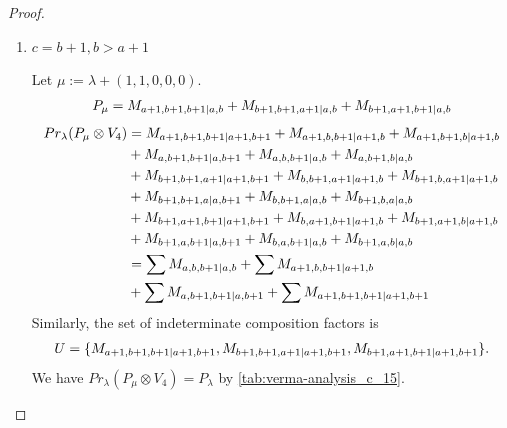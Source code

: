 \begin{proof}
\begin{enumerate}
\begin{enumerate}
        \item $c=b+1,b>a+1$ \par
        Let $\mu:=\lambda + (1,1,0,0,0) $.
        \begin{equation}\notag
          \begin{aligned}
            P_\mu = M_{a+1,b+1,b+1|a,b}
+ M_{b+1,b+1,a+1|a,b}
+ M_{b+1,a+1,b+1|a,b}
          \end{aligned}
        \end{equation}
        \begin{equation}\notag
          \begin{aligned}
            Pr_{\lambda}(P_\mu \otimes V_{4}) &=
M_{a+1,b+1,b+1|a+1,b+1}
+ M_{a+1,b,b+1|a+1,b}
+ M_{a+1,b+1,b|a+1,b}\\
                                              &
+ M_{a,b+1,b+1|a,b+1}
+ M_{a,b,b+1|a,b}
+ M_{a,b+1,b|a,b}\\
                                              &
+ M_{b+1,b+1,a+1|a+1,b+1}
+ M_{b,b+1,a+1|a+1,b}
+ M_{b+1,b,a+1|a+1,b}\\
                                              &
+ M_{b+1,b+1,a|a,b+1}
+ M_{b,b+1,a|a,b}
+ M_{b+1,b,a|a,b}\\
                                              &
+ M_{b+1,a+1,b+1|a+1,b+1}
+ M_{b,a+1,b+1|a+1,b}
+ M_{b+1,a+1,b|a+1,b}\\
                                              &
+ M_{b+1,a,b+1|a,b+1}
+ M_{b,a,b+1|a,b}
+ M_{b+1,a,b|a,b} \\
                                               &=
\sum M_{a,b,b+1|a,b}
+ \sum M_{a+1,b,b+1|a+1,b}\\
                                              &
+ \sum M_{a,b+1,b+1|a,b+1}
+ \sum M_{a+1,b+1,b+1|a+1,b+1}
          \end{aligned}
        \end{equation}
      Similarly, the set of indeterminate composition factors is 
\begin{equation}\notag
  \begin{aligned}
    U = \{
M_{a+1,b+1,b+1|a+1,b+1},
M_{b+1,b+1,a+1|a+1,b+1},
M_{b+1,a+1,b+1|a+1,b+1}
\}.
  \end{aligned}
\end{equation}
       We have $Pr_{\lambda}(P_\mu \otimes V_{4}) = P_\lambda  $ by \cref{tab:verma-analysis_c_15}.
\begin{table}[htbp]
\centering
\caption{Calculation of Verma modules in $\operatorname{Filt}(P_*) \setminus \operatorname{Filt}(\prl(P_\lambda \otimes V_{4})) $ } \label{tab:verma-analysis_c_15}

\end{table}
\end{enumerate}
\end{enumerate}
\end{proof}

